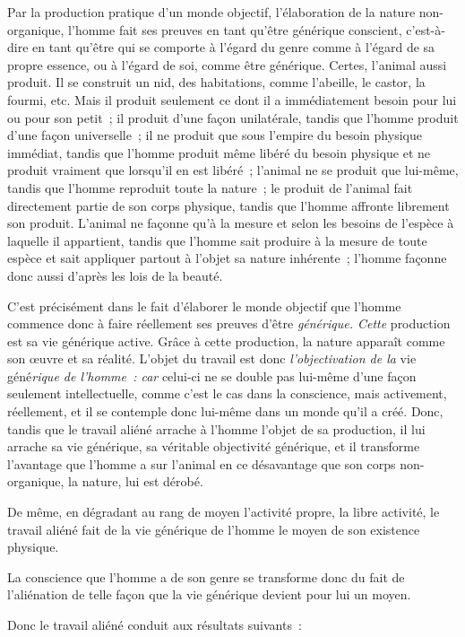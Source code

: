 \documentclass[french,twoside]{book} %
\begin{document}
Par la production pratique d’un monde objectif, l’élaboration de la nature non-organique, l’homme fait ses preuves en tant qu’être générique conscient, c’est-à-dire en tant qu’être qui se comporte à l’égard du genre comme à l’égard de sa propre essence, ou à l’égard de soi, comme être générique. Certes, l’animal aussi produit. Il se construit un nid, des habitations, comme l’abeille, le castor, la fourmi, etc. Mais il produit seulement ce dont il a immédiatement besoin pour lui ou pour son petit ; il produit d’une façon unilatérale, tandis que l’homme produit d’une façon universelle ; il ne produit que sous l’empire du besoin physique immédiat, tandis que l’homme produit même libéré du besoin physique et ne produit vraiment que lorsqu’il en est libéré ; l’animal ne se produit que lui-même, tandis que l’homme reproduit toute la nature ; le produit de l’animal fait directement partie de son corps physique, tandis que l’homme affronte librement son produit. L’animal ne façonne qu’à la mesure et selon les besoins de l’espèce à laquelle il appartient, tandis que l’homme sait produire à la mesure de toute espèce et sait appliquer partout à l’objet sa nature inhérente ; l’homme façonne donc aussi d’après les lois de la beauté.\par
C’est précisément dans le fait d’élaborer le monde objectif que l’homme commence donc à faire réellement ses preuves d’être \emph{générique. Cette} production est sa vie générique active. Grâce à cette production, la nature apparaît comme son œuvre et sa réalité. L’objet du travail est donc \emph{l’objectivation de la} vie géné\emph{rique de l’homme : car} celui-ci ne se double pas lui-même d’une façon seulement intellectuelle, comme c’est le cas dans la conscience, mais activement, réellement, et il se contemple donc lui-même dans un monde qu’il a créé. Donc, tandis que le travail aliéné arrache à l’homme l’objet de sa production, il lui arrache sa vie générique, sa véritable objectivité générique, et il transforme l’avantage que l’homme a sur l’animal en ce désavantage que son corps non-organique, la nature, lui est dérobé.\par
De même, en dégradant au rang de moyen l’activité propre, la libre activité, le travail aliéné fait de la vie générique de l’homme le moyen de son existence physique.\par
La conscience que l’homme a de son genre se transforme donc du fait de l’aliénation de telle façon que la vie générique devient pour lui un moyen.\par
Donc le travail aliéné conduit aux résultats suivants :\par
\end{document}
